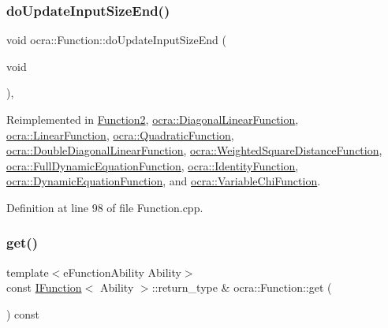 \subsubsection{\texorpdfstring{do\+Update\+Input\+Size\+End()}{doUpdateInputSizeEnd()}}
{\footnotesize\ttfamily void ocra\+::\+Function\+::do\+Update\+Input\+Size\+End (\begin{DoxyParamCaption}\item[{void}]{ }\end{DoxyParamCaption})\hspace{0.3cm}{\ttfamily [protected]}, {\ttfamily [virtual]}}



Reimplemented in \hyperlink{classFunction2_a6a875214e7fa8b07f064cd699ac29ff6}{Function2}, \hyperlink{classocra_1_1DiagonalLinearFunction_a8a51d23c302c9bad9579b95e29481f55}{ocra\+::\+Diagonal\+Linear\+Function}, \hyperlink{classocra_1_1LinearFunction_ac6bdf62ad6634397778d5f4223ed6d82}{ocra\+::\+Linear\+Function}, \hyperlink{classocra_1_1QuadraticFunction_ab3d5478fd8ded343453e0489c595e580}{ocra\+::\+Quadratic\+Function}, \hyperlink{classocra_1_1DoubleDiagonalLinearFunction_a89070f8f2b068d8b6b3e216433e50538}{ocra\+::\+Double\+Diagonal\+Linear\+Function}, \hyperlink{classocra_1_1WeightedSquareDistanceFunction_ab05ab6021a40ed308b7e0d67b5a55b82}{ocra\+::\+Weighted\+Square\+Distance\+Function}, \hyperlink{group__constraint_ga8c14a0ff3f87c32d030a3a1753b7a77e}{ocra\+::\+Full\+Dynamic\+Equation\+Function}, \hyperlink{classocra_1_1IdentityFunction_adcfa8a32491113a590e7066f0062fbc6}{ocra\+::\+Identity\+Function}, \hyperlink{classocra_1_1DynamicEquationFunction_a8d20f6ed1e3983d1fddf648729eba955}{ocra\+::\+Dynamic\+Equation\+Function}, and \hyperlink{classocra_1_1VariableChiFunction_adbc1bb06d86e8ef65e8cdeb55db15353}{ocra\+::\+Variable\+Chi\+Function}.



Definition at line 98 of file Function.\+cpp.

\hypertarget{classocra_1_1Function_a244404069d9ab169fbb23309785693b8}{}\label{classocra_1_1Function_a244404069d9ab169fbb23309785693b8} 
\subsubsection{\texorpdfstring{get()}{get()}\hspace{0.1cm}{\footnotesize\ttfamily [1/2]}}
{\footnotesize\ttfamily template$<$e\+Function\+Ability Ability$>$ \\
const \hyperlink{classocra_1_1IFunction}{I\+Function}$<$ Ability $>$\+::return\+\_\+type \& ocra\+::\+Function\+::get (\begin{DoxyParamCaption}{ }\end{DoxyParamCaption}) const\hspace{0.3cm}{\ttfamily [inline]}}

